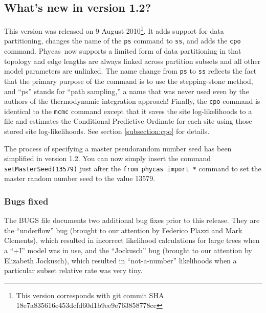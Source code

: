 \documentclass[10pt]{article}
\newcommand{\code}[1]{{\tt #1}}					%
\newcommand{\cmd}[1]{{\tt \small #1}\index{#1}}	%
\newcommand{\phycas}{{\sc Phycas}\index{Phycas}}
\begin{document}
\subsection{What's new in version 1.2?} %
This version was released on 9 August 2010\footnote{This version corresponds with git commit SHA 18e7a835616e453dcfd60d1b9ee9e763858778cc}. It adds support for data partitioning, changes the name of the \cmd{ps} command to \cmd{ss}, and adds the \cmd{cpo} command. \phycas\ now supports a limited form of data partitioning in that topology and edge lengths are always linked across partition subsets and all other model parameters are unlinked. The name change from \cmd{ps} to \cmd{ss} reflects the fact that the primary purpose of the command is to use the stepping-stone method, and ``ps'' stands for ``path sampling,'' a name that was never used even by the authors of the thermodynamic integration approach! Finally, the \cmd{cpo} command is identical to the \cmd{mcmc} command except that it saves the site log-likelihoods to a file and estimates the Conditional Predictive Ordinate for each site using those stored site log-likelihoods. See section \ref{subsection:cpo} for details. 

The process of specifying a master pseudorandom number seed has been simplified in version 1.2. You can now simply insert the command \code{setMasterSeed(13579)} just after the \code{from phycas import *} command to set the master random number seed to the value 13579.

\subsubsection{Bugs fixed}
The BUGS file documents two additional bug fixes prior to this release. They are the ``underflow'' bug (brought to our attention by Federico Plazzi and Mark Clements), which resulted in incorrect likelihood calculations for large trees when a ``+I'' model was in use, and the ``Jockusch'' bug (brought to our attention by Elizabeth Jockusch), which resulted in ``not-a-number'' likelihoods when a particular subset relative rate was very tiny.

\end{document}
